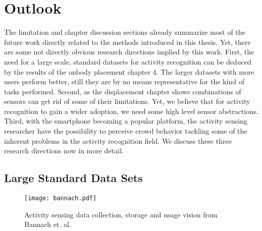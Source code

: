 \section{Outlook}
The limitation and chapter discussion sections already summarize most of the future work
directly related to the methods introduced in this thesis. Yet, there
are some not directly obvious research directions implied by this work.
 First, the need for a large scale, standard datasets for activity recognition
can be deduced by the results of the onbody placement chapter 4.
The larger datasets with more users perform better, still they are by
no means representative for the kind of tasks performed.
Second, as the displacement chapter shows combinations of sensors
can get rid of some of their limitations. Yet, we believe that
for activity recognition to gain a wider adoption, we need some
high level sensor abstractions.
Third, with the smartphone becoming a popular platform, the activity
sensing researcher have the possibility to perceive crowd behavior
tackling some of the inherent problems in the activity recognition field. 
We discuss these three research directions now in more detail. 



\subsection{Large Standard Data Sets}

\begin{figure}[t]
  \begin{center}
  \texttt{[image: bannach.pdf]}
	\end{center}
  \caption[Activity sensing data collection]{Activity sensing data collection, storage and usage
   vision from Bannach
   et. al.~\cite{Bannach:2010wt}} \label{fig:dbannach} \end{figure}




